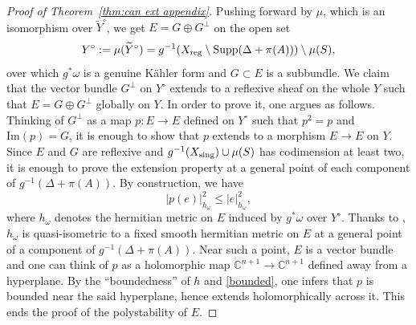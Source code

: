 \documentclass[12pt]{amsart}
\theoremstyle{definition}
\newcommand{\tY}{\widetilde{Y}}
\newcommand{\Supp}{\mathrm{Supp}}
\numberwithin{equation}{section}
\newcommand{\C}{\mathbb C}
\begin{document}
\begin{proof}[Proof of Theorem~\ref{thm:can ext appendix}]
Pushing forward by $\mu$, which is an isomorphism over $\tY^\circ$, we get $E=G\oplus G^\perp$ on the open set
\[
Y^\circ:=\mu(\tY^\circ)=g^{-1}(X_{\rm reg}\setminus \Supp(\Delta+\pi(A)))\setminus \mu(S),
\]
over which $g^*\omega$ is a genuine K\"ahler form and $G\subset E$ is a subbundle. We claim that the vector bundle $G^\perp$ on $Y^\circ$ extends to a reflexive sheaf on the whole $Y$ such that $E=G\oplus G^\perp$ globally on $Y$. In order to prove it, one argues as follows. Thinking of $G^\perp$ as a map $p:E\to E$ defined on $Y^\circ$ such that $p^2=p$ and $\mathrm{Im}(p)=G$, it is enough to show that $p$ extends to a morphism $E\to E$ on $Y$. Since $E$ and $G$ are reflexive and $g^{-1}(X_{\rm sing})\cup \mu(S)$ has codimension at least two, it is enough to prove the extension property at a general point of each component of $g^{-1}(\Delta+\pi(A))$. By construction, we have
\begin{equation}
\label{bounded-projection}
|p(e)|^2_{h_\omega}\le |e|^2_{h_\omega},
\end{equation}
where $h_\omega$ denotes the hermitian metric on $E$ induced by $g^*\omega$ over $Y^\circ$. Thanks to \cite[Theorem~2]{GP-conic}, $h_\omega$ is quasi-isometric to a fixed smooth hermitian metric on $E$ at a general point of a component of $g^{-1}(\Delta+\pi(A))$. Near such a point, $E$ is a vector bundle and one can think of $p$ as a holomorphic map $\C^{n+1}\to \C^{n+1}$ defined away from a hyperplane. By the ``boundedness'' of $h$ and \eqref{bounded}, one infers that $p$ is bounded near the said hyperplane, hence extends holomorphically across it. This ends the proof of the polystability of $E$.

\bigskip


\end{proof}
\end{document}
